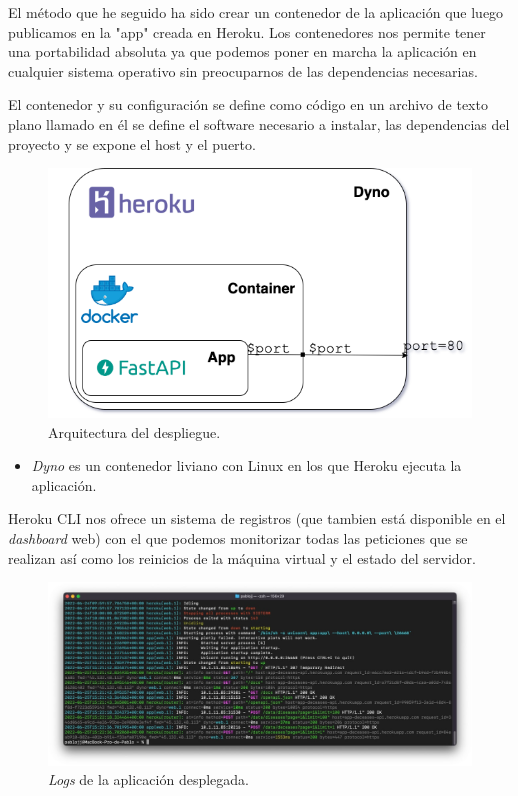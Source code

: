 El método que he seguido ha sido crear un contenedor de la aplicación que luego publicamos en la "app" creada en Heroku. Los contenedores nos permite tener una portabilidad absoluta ya que podemos poner en marcha la aplicación en cualquier sistema operativo sin preocuparnos de las dependencias necesarias.

El contenedor y su configuración se define como código en un archivo de texto plano llamado  en él se define el software necesario a instalar, las dependencias del proyecto y se expone el host y el puerto.

\FloatBarrier
\begin{figure}[]
	\centering	
	\includegraphics[scale=0.5]{doc/logos/imgs/deployd.png}
	\caption{ Arquitectura del despliegue. }
    \label{fig:tipos-de-cc}
\end{figure}
\FloatBarrier

\begin{itemize}
    \item \textit{Dyno} es un contenedor liviano con Linux en los que Heroku ejecuta la aplicación.
\end{itemize}

Heroku CLI nos ofrece un sistema de registros (que tambien está disponible en el \textit{dashboard} web) con el que podemos monitorizar todas las peticiones que se realizan así como los reinicios de la máquina virtual y el estado del servidor.

\FloatBarrier
\begin{figure}[]
	\centering	
	\includegraphics[scale=0.5]{doc/logos/imgs/logs.jpg}
	\caption{ \textit{Logs} de la aplicación desplegada. }
    \label{fig:heroku-logs}
\end{figure}
\FloatBarrier

